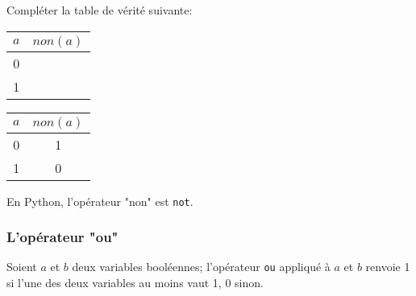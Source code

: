 \documentclass[12pt]{article}
\begin{document}
	\begin{MonExo}
		Compléter la table de vérité suivante:
		\\
		
		\begin{center}		
			\begin{tabular}{|c|c|}
				\hline
				$a$ & $non(a)$ \\ \hline
				0 &  \\
				\hline
				1 &  \\
				\hline
			\end{tabular}
		\end{center}
	\end{MonExo}
	\begin{MaReponse}
		\begin{center}		
			\begin{tabular}{|c|c|}
				\hline
				$a$ & $non(a)$ \\ \hline
				0 & 1 \\
				\hline
				1 & 0 \\
				\hline
			\end{tabular}
		\end{center}
	\end{MaReponse}
	
	
	En Python, l'opérateur "non" est \texttt{not}.
	
	\subsubsection*{L'opérateur "ou"}
	Soient $a$ et $b$ deux variables booléennes; l'opérateur \texttt{ou} appliqué à $a$ et $b$ renvoie 1 si l'une des deux variables au moins vaut 1, 0 sinon.
	
\end{document}
